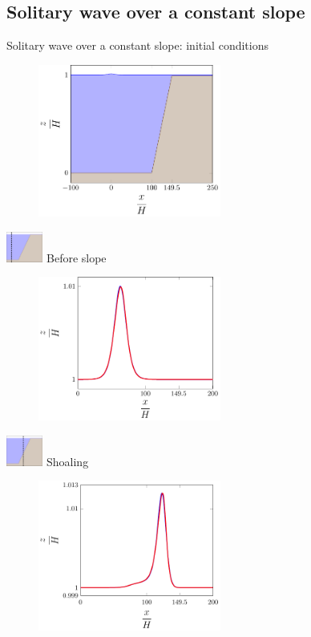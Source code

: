 \documentclass[pdf]{beamer}
\begin{document}
\subsection{Solitary wave over a constant slope}
\begin{frame}{Solitary wave over a constant slope: initial conditions}
			\begin{figure}
				\centering
				\includegraphics[width=6cm]{./Pics/Diagram/1-figure0.pdf}
			\end{figure}
\end{frame}

\begin{frame}{\includegraphics[width=1.2cm]{./Pics/Diagram/1n-figure0.pdf}  \hspace{1cm } Before slope }
	\begin{figure}
		\centering
		\includegraphics[width=6cm]{./Pics/20s.pdf}
	\end{figure}
\end{frame}

\begin{frame}{ \includegraphics[width=1.2cm]{./Pics/Diagram/1n1-figure0.pdf}  \hspace{1cm } Shoaling }
	\begin{figure}
		\includegraphics[width=6cm]{./Pics/40s.pdf}
	\end{figure}
\end{frame}
\end{document}
